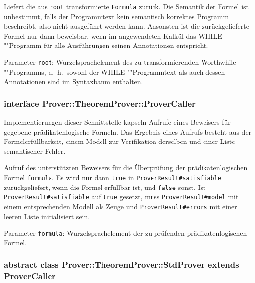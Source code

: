 \begin{description}%

    Liefert die aus \texttt{root} transformierte \texttt{Formula}
    zurück. Die Semantik der Formel ist unbestimmt, falls der
    Programmtext kein semantisch korrektes Programm beschreibt, also
    nicht ausgeführt werden kann. Ansonsten ist die zurückgelieferte
    Formel nur dann beweisbar, wenn im angewendeten Kalkül das
    WHILE-""Programm für alle Ausführungen seinen Annotationen
    entspricht.%

    Parameter \texttt{root}: Wurzelsprachelement des zu
    transformierenden Worthwhile-""Programms, d.~h.\ sowohl der
    WHILE-""Programmtext als auch dessen Annotationen sind im
    Syntaxbaum enthalten.%

\end{description}%

\subsubsection{interface Prover::TheoremProver::ProverCaller}%

Implementierungen dieser Schnittstelle kapseln Aufrufe eines Beweisers
für gegebene prädikatenlogische Formeln. Das Ergebnis eines Aufrufs
besteht aus der Formelerfüllbarkeit, einem Modell zur Verifikation
derselben und einer Liste semantischer Fehler.%

\begin{description}%

    Aufruf des unterstützten Beweisers für die Überprüfung der
    prädikatenlogischen Formel \texttt{formula}. Es wird nur dann
    \texttt{true} in \texttt{ProverResult\#satisfiable}
    zurückgeliefert, wenn die Formel erfüllbar ist, und \texttt{false}
    sonst. Ist \texttt{ProverResult\#satisfiable} auf \texttt{true}
    gesetzt, muss \texttt{ProverResult\#model} mit einem
    entsprechenden Modell als Zeuge und \texttt{ProverResult\#errors}
    mit einer leeren Liste initialisiert sein.%

    Parameter \texttt{formula}: Wurzelsprachelement der zu prüfenden
    prädikatenlogischen Formel.%

\end{description}%

\subsubsection{abstract class Prover::TheoremProver::StdProver extends ProverCaller}%

